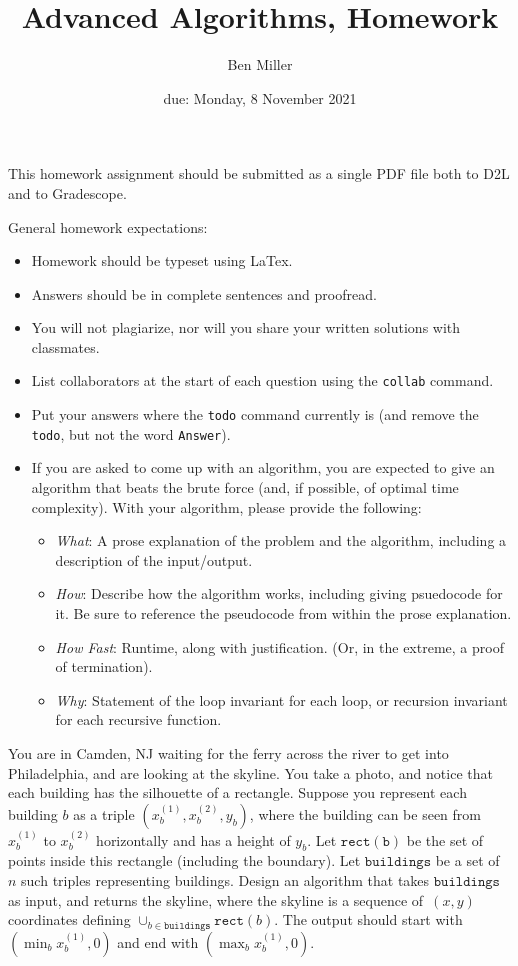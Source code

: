 \documentclass{article}
\title{Advanced Algorithms, Homework \hwnum}
\author{Ben Miller}
\date{due: Monday, 8 November 2021}
\begin{document}
\maketitle

This homework assignment should be
submitted as a single PDF file both to D2L and to Gradescope.

General homework expectations:
\begin{itemize}
    \item Homework should be typeset using LaTex.
    \item Answers should be in complete sentences and proofread.
    \item You will not plagiarize, nor will you share your written solutions
        with classmates.
    \item List collaborators at the start of each question using the
        \texttt{collab} command.
    \item Put your answers where the \texttt{todo} command currently is (and
        remove the \texttt{todo}, but not the word \texttt{Answer}).
    \item If you are asked to come up with an algorithm, you are
        expected to give an algorithm that beats the brute force (and, if possible, of
        optimal time complexity). With your algorithm, please provide the following:
        \begin{itemize}
            \item \emph{What}: A prose explanation of the problem and the algorithm,
                including a description of the input/output.
            \item \emph{How}: Describe how the algorithm works, including giving
                psuedocode for it.  Be sure to reference the pseudocode
                from within the prose explanation.
            \item \emph{How Fast}: Runtime, along with justification.  (Or, in the
                extreme, a proof of termination).
            \item \emph{Why}: Statement of the loop invariant for each loop, or
                recursion invariant for each recursive function.
        \end{itemize}
\end{itemize}

\collab{\todo{}}

You are in Camden, NJ waiting for the ferry across the river to
get into Philadelphia, and are looking at the skyline.  You take a photo, and notice that each building
has the silhouette of a rectangle.  Suppose you  represent each building $b$ as a
triple $(x_b^{(1)},x_b^{(2)},y_b)$, where the building can be seen from $x_b^{(1)}$ to $x_b^{(2)}$
horizontally and has a height of $y_b$.  Let $\mathtt{rect(b)}$ be the set of
points inside this rectangle (including the boundary).  Let $\mathtt{buildings}$
be a set of $n$ such triples representing buildings. Design an algorithm that takes $\mathtt{buildings}$ as input, and
returns the skyline, where the skyline is a sequence of~$(x,y)$ coordinates
defining $\cup_{b \in \mathtt{buildings}} \mathtt{rect}(b)$.  The output should
start with $(\min_b{x_b^{(1)}},0)$ and end with $(\max_b{x_b^{(1)}},0)$.
\end{document}
